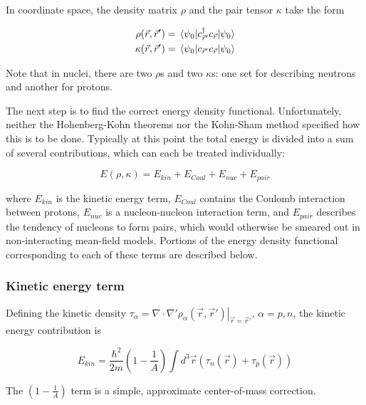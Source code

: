 In coordinate space, the density matrix $\rho$ and the pair tensor $\kappa$ take the form

\begin{align}
\rho(\vec{r},\vec{r}') &= \expval{c_{\vec{r}'}^\dagger c_{\vec{r}}}{\psi_0} \\
\kappa(\vec{r},\vec{r}') &= \expval{c_{\vec{r}'} c_{\vec{r}}}{\psi_0}
\end{align}

\noindent Note that in nuclei, there are two $\rho$s and two $\kappa$s: one set for describing neutrons and another for protons.

The next step is to find the correct energy density functional. Unfortunately, neither the Hohenberg-Kohn theorems nor the Kohn-Sham method specified how this is to be done. Typically at this point the total energy is divided into a sum of several contributions, which can each be treated individually:

\begin{equation}
E(\rho, \kappa) = E_{kin} + E_{Coul} + E_{nuc} + E_{pair}
\end{equation}

\noindent where $E_{kin}$ is the kinetic energy term, $E_{Coul}$ contains the Coulomb interaction between protons, $E_{nuc}$ is a nucleon-nucleon interaction term, and $E_{pair}$ describes the tendency of nucleons to form pairs, which would otherwise be smeared out in non-interacting mean-field models. Portions of the energy density functional corresponding to each of these terms are described below.

\subsubsection{Kinetic energy term}

Defining the kinetic density $\tau_\alpha = \left.\nabla\cdot\nabla'\rho_\alpha(\vec{r},\vec{r}')\right|_{\vec{r}=\vec{r}'}$, $\alpha=p,n$, the kinetic energy contribution is

\begin{equation}
E_{kin} = \frac{\hbar^2}{2m} \left(1-\frac{1}{A}\right) \int d^3\vec{r} \left(\tau_n(\vec{r}) + \tau_p(\vec{r}) \right)
\end{equation}

\noindent The $\left(1-\frac{1}{A}\right)$ term is a simple, approximate center-of-mass correction.

